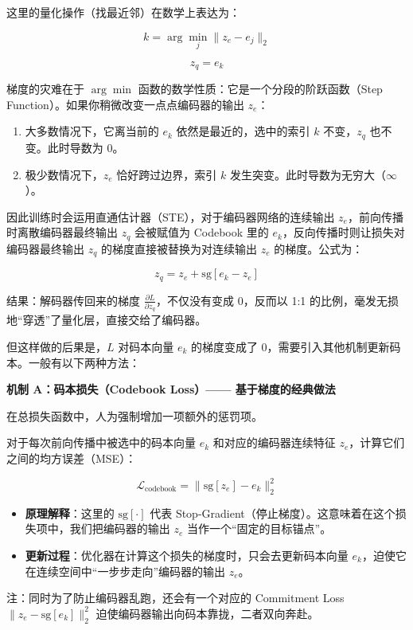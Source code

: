 这里的量化操作（找最近邻）在数学上表达为：

\[
k=\arg\min_j\lVert z_e-e_j\rVert_2
\]

\[
z_q=e_k
\]

梯度的灾难在于 \(\arg\min\) 函数的数学性质：它是一个分段的阶跃函数（Step Function）。如果你稍微改变一点点编码器的输出 \(z_e\)：

\begin{enumerate}
\def\labelenumi{\arabic{enumi}.}
\tightlist
\item
  大多数情况下，它离当前的 \(e_k\) 依然是最近的，选中的索引 \(k\) 不变，\(z_q\) 也不变。此时导数为 0。
\item
  极少数情况下，\(z_e\) 恰好跨过边界，索引 \(k\) 发生突变。此时导数为无穷大（\(\infty\)）。
\end{enumerate}

因此训练时会运用直通估计器（STE），对于编码器网络的连续输出 \(z_e\)，前向传播时离散编码器最终输出 \(z_q\) 会被赋值为 Codebook 里的 \(e_k\)，反向传播时则让损失对编码器最终输出 \(z_q\) 的梯度直接被替换为对连续输出 \(z_e\) 的梯度。公式为：

\[
z_q=z_e+\mathrm{sg}[e_k-z_e]
\]

结果：解码器传回来的梯度 \(\frac{\partial L}{\partial z_q}\)，不仅没有变成 0，反而以 1:1 的比例，毫发无损地``穿透''了量化层，直接交给了编码器。

但这样做的后果是，\(L\) 对码本向量 \(e_k\) 的梯度变成了 0，需要引入其他机制更新码本。一般有以下两种方法：

\textbf{机制 A：码本损失（Codebook Loss）------ 基于梯度的经典做法}

在总损失函数中，人为强制增加一项额外的惩罚项。

对于每次前向传播中被选中的码本向量 \(e_k\) 和对应的编码器连续特征 \(z_e\)，计算它们之间的均方误差（MSE）：

\[
\mathcal{L}_{\mathrm{codebook}}
=\lVert \mathrm{sg}[z_e]-e_k\rVert_2^2
\]

\begin{itemize}
\tightlist
\item
  \textbf{原理解释}：这里的 \(\mathrm{sg}[\cdot]\) 代表 Stop-Gradient（停止梯度）。这意味着在这个损失项中，我们把编码器的输出 \(z_e\) 当作一个``固定的目标锚点''。
\item
  \textbf{更新过程}：优化器在计算这个损失的梯度时，只会去更新码本向量 \(e_k\)，迫使它在连续空间中``一步步走向''编码器的输出 \(z_e\)。
\end{itemize}

注：同时为了防止编码器乱跑，还会有一个对应的 Commitment Loss \(\lVert z_e-\mathrm{sg}[e_k]\rVert_2^2\) 迫使编码器输出向码本靠拢，二者双向奔赴。

